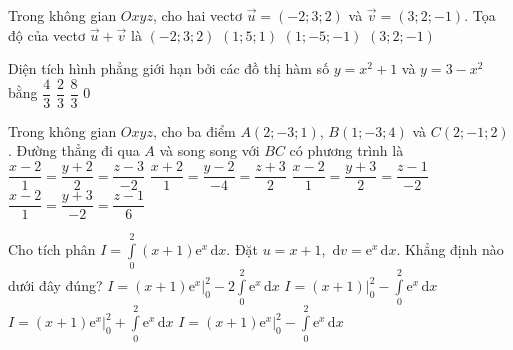 \begin{ex}%
	Trong không gian $Oxyz$, cho hai vectơ $\overrightarrow{u}=(-2;3;2)$ và $\overrightarrow{v}=(3;2;-1)$. Tọa độ của vectơ $\overrightarrow{u}+\overrightarrow{v}$ là
	\choice
	{$(-2;3;2)$}
	{\True $(1;5;1)$}
	{$(1;-5;-1)$}
	{$(3;2;-1)$}	
\end{ex}

\begin{ex}%
	Diện tích hình phẳng giới hạn bởi các đồ thị hàm số $y=x^2+1$ và $y=3-x^2$ bằng
	\choice
	{$\dfrac{4}{3}$}
	{$\dfrac{2}{3}$}
	{\True $\dfrac{8}{3}$}
	{$0$}	
\end{ex}

\begin{ex}%
	Trong không gian $Oxyz$, cho ba điểm $A(2;-3;1)$, $B(1;-3;4)$ và $C(2;-1;2)$. Đường thẳng đi qua $A$ và song song với $BC$ có phương trình là
	\choice
	{$\dfrac{x-2}{1}=\dfrac{y+2}{2}=\dfrac{z-3}{-2}$}
	{$\dfrac{x+2}{1}=\dfrac{y-2}{-4}=\dfrac{z+3}{2}$}
	{\True $\dfrac{x-2}{1}=\dfrac{y+3}{2}=\dfrac{z-1}{-2}$}
	{$\dfrac{x-2}{1}=\dfrac{y+3}{-2}=\dfrac{z-1}{6}$}	
\end{ex}

\begin{ex}%
	Cho tích phân $I=\displaystyle\int\limits_0^2(x+1)\mathrm{e}^x\mathrm{\,d}x$. Đặt $u=x+1$, $\mathrm{\,d}v=\mathrm{e}^x\mathrm{\,d}x$. Khẳng định nào dưới đây đúng?
	\choice
	{$I=(x+1)\mathrm{e}^x\Big|_0^2-2\displaystyle\int\limits_0^2\mathrm{e}^x\mathrm{\,d}x$}
	{$I=(x+1)\Big|_0^2-\displaystyle\int\limits_0^2\mathrm{e}^x\mathrm{\,d}x$}
	{$I=(x+1)\mathrm{e}^x\Big|_0^2+\displaystyle\int\limits_0^2\mathrm{e}^x\mathrm{\,d}x$}
	{\True $I=(x+1)\mathrm{e}^x\Big|_0^2-\displaystyle\int\limits_0^2\mathrm{e}^x\mathrm{\,d}x$}	
\end{ex}

